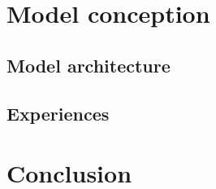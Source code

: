 \documentclass[paper=a4, fontsize=11pt]{scrartcl}
\begin{document}

\newpage


\newpage

\renewcommand{\contentsname}{Table of contents}
\tableofcontents
\newpage

\listoffigures

\listoftables



\newpage


\newpage


\newpage


\newpage

\section{Model conception}

\subsection{Model architecture}

\subsection{Experiences}

\newpage

\section{Conclusion}
\newpage

\printbibliography[heading=bibintoc, title={Bibliography}]
\newpage


\end{document}
